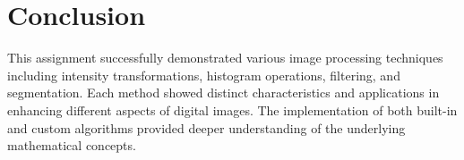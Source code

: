 \documentclass[10pt,a4paper]{article}
\begin{document}
\section{Conclusion}
This assignment successfully demonstrated various image processing techniques including intensity transformations, histogram operations, filtering, and segmentation. Each method showed distinct characteristics and applications in enhancing different aspects of digital images. The implementation of both built-in and custom algorithms provided deeper understanding of the underlying mathematical concepts.
\end{document}
